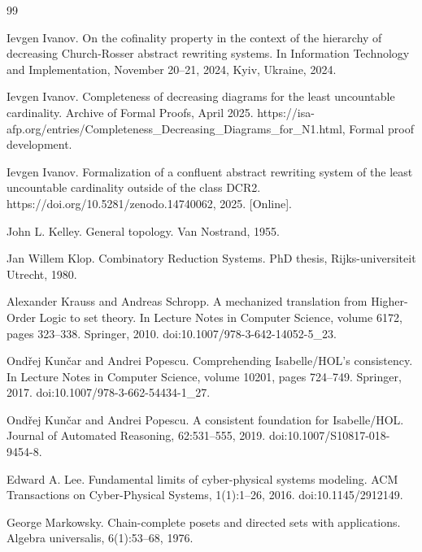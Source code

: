 \documentclass[10pt,a4paper]{amsart}
\begin{document}
\begin{thebibliography}{99}
\par\noindent  [20]  Ievgen Ivanov.  On the cofinality property in the context of the hierarchy of decreasing Church-Rosser abstract rewriting systems.  In Information Technology and Implementation, November 20–21, 2024, Kyiv, Ukraine, 2024.  
 
\par\noindent  [21]  Ievgen Ivanov.  Completeness of decreasing diagrams for the least uncountable cardinality.  Archive of Formal Proofs, April 2025.   https://isa-afp.org/entries/Completeness\_Decreasing\_Diagrams\_for\_N1.html, Formal proof development.  
 
\par\noindent  [22]  Ievgen Ivanov.  Formalization of a confluent abstract rewriting system of the least uncountable cardinality outside of the class DCR2.  https://doi.org/10.5281/zenodo.14740062, 2025.  [Online].  
 
\par\noindent  [23]  John L. Kelley.  General topology.  Van Nostrand, 1955.  
 
\par\noindent  [24]  Jan Willem Klop.  Combinatory Reduction Systems.  PhD thesis, Rijks-universiteit Utrecht, 1980.  
 
\par\noindent  [25]  Alexander Krauss and Andreas Schropp.  A mechanized translation from Higher-Order Logic to set theory.  In Lecture Notes in Computer Science, volume 6172, pages 323–338. Springer, 2010.  doi:10.1007/978-3-642-14052-5\_23.  
 
\par\noindent  [26]  Ondřej Kunčar and Andrei Popescu.  Comprehending Isabelle/HOL’s consistency.  In Lecture Notes in Computer Science, volume 10201, pages 724–749. Springer, 2017.  doi:10.1007/978-3-662-54434-1\_27.  
 
\par\noindent  [27]  Ondřej Kunčar and Andrei Popescu.  A consistent foundation for Isabelle/HOL.  Journal of Automated Reasoning, 62:531–555, 2019.  doi:10.1007/S10817-018-9454-8.  
 
\par\noindent  [28]  Edward A. Lee.  Fundamental limits of cyber-physical systems modeling.  ACM Transactions on Cyber-Physical Systems, 1(1):1–26, 2016.  doi:10.1145/2912149.  
 
\par\noindent  [29]  George Markowsky.  Chain-complete posets and directed sets with applications.  Algebra universalis, 6(1):53–68, 1976.  
 

\end{thebibliography}
\end{document}
